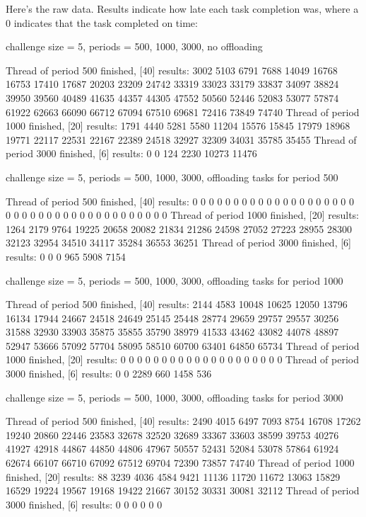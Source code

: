 \documentclass[twoside,twocolumn]{article}
\begin{document}
Here's the raw data.
Results indicate how late each task completion was, where a 0 indicates that the task completed on time:

challenge size = 5, periods = {500, 1000, 3000}, no offloading

Thread of period 500 finished, [40] results: 3002 5103 6791 7688 14049 16768 16753 17410 17687 20203 23209 24742 33319 33023 33179 33837 34097 38824 39950 39560 40489 41635 44357 44305 47552 50560 52446 52083 53077 57874 61922 62663 66090 66712 67094 67510 69681 72416 73849 74740
Thread of period 1000 finished, [20] results: 1791 4440 5281 5580 11204 15576 15845 17979 18968 19771 22117 22531 22167 22389 24518 32927 32309 34031 35785 35455 
Thread of period 3000 finished, [6] results: 0 0 124 2230 10273 11476

challenge size = 5, periods = {500, 1000, 3000}, offloading tasks for period 500

Thread of period 500 finished, [40] results: 0 0 0 0 0 0 0 0 0 0 0 0 0 0 0 0 0 0 0 0 0 0 0 0 0 0 0 0 0 0 0 0 0 0 0 0 0 0 0 0
Thread of period 1000 finished, [20] results: 1264 2179 9764 19225 20658 20082 21834 21286 24598 27052 27223 28955 28300 32123 32954 34510 34117 35284 36553 36251
Thread of period 3000 finished, [6] results: 0 0 0 965 5908 7154

challenge size = 5, periods = {500, 1000, 3000}, offloading tasks for period 1000

Thread of period 500 finished, [40] results: 2144 4583 10048 10625 12050 13796 16134 17944 24667 24518 24649 25145 25448 28774 29659 29757 29557 30256 31588 32930 33903 35875 35855 35790 38979 41533 43462 43082 44078 48897 52947 53666 57092 57704 58095 58510 60700 63401 64850 65734
Thread of period 1000 finished, [20] results: 0 0 0 0 0 0 0 0 0 0 0 0 0 0 0 0 0 0 0 0 
Thread of period 3000 finished, [6] results: 0 0 2289 660 1458 536

challenge size = 5, periods = {500, 1000, 3000}, offloading tasks for period 3000

Thread of period 500 finished, [40] results: 2490 4015 6497 7093 8754 16708 17262 19240 20860 22446 23583 32678 32520 32689 33367 33603 38599 39753 40276 41927 42918 44867 44850 44806 47967 50557 52431 52084 53078 57864 61924 62674 66107 66710 67092 67512 69704 72390 73857 74740 
Thread of period 1000 finished, [20] results: 88 3239 4036 4584 9421 11136 11720 11672 13063 15829 16529 19224 19567 19168 19422 21667 30152 30331 30081 32112
Thread of period 3000 finished, [6] results: 0 0 0 0 0 0

\end{document}
